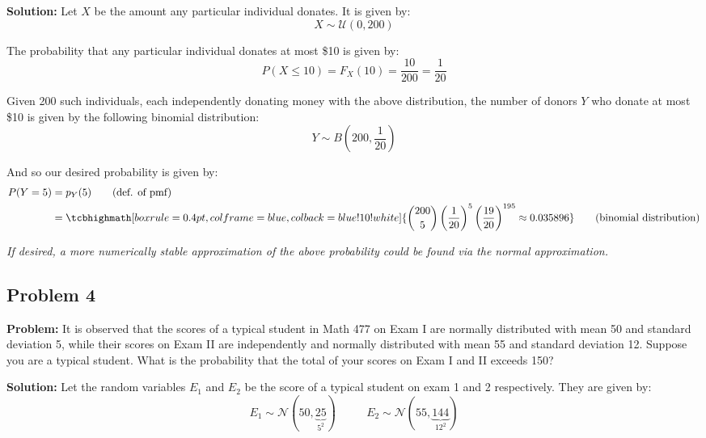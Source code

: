 \documentclass{article}
\begin{document}
\noindent\textbf{Solution:} Let $X$ be the amount any particular individual donates. It is given by:
\begin{equation*}
    X\sim\mathcal U(0,200)
\end{equation*}

The probability that any particular individual donates at most \$10 is given by:
\begin{equation*}
    P(X\le 10)=F_X(10)=\frac{10}{200}=\frac{1}{20}
\end{equation*}

Given 200 such individuals, each independently donating money with the above distribution, the number of donors $Y$ who donate at most \$10 is given by the following binomial distribution:
\begin{equation*}
    Y\sim B\left(200,\frac{1}{20}\right)
\end{equation*}

And so our desired probability is given by:
\begin{align*}
    P(Y=5)&=p_Y(5)\tag{def. of pmf}\\
    &=\tcbhighmath[boxrule=0.4pt,colframe=blue,colback=blue!10!white]{\binom{200}5 \left(\frac{1}{20}\right)^5\left(\frac{19}{20}\right)^{195}\approx0.035896}\tag{binomial distribution}
\end{align*}

\textit{If desired, a more numerically stable approximation of the above probability could be found via the normal approximation.}

\subsection*{Problem 4}
\noindent\textbf{Problem:} It is observed that the scores of a typical student in Math 477 on Exam I are normally distributed with mean 50 and standard deviation 5, while their scores on Exam II are independently and normally distributed with mean 55 and standard deviation 12. Suppose you are a typical student. What is the probability that the total of your scores on Exam I and II
exceeds 150?
\bigskip

\noindent\textbf{Solution:} Let the random variables $E_1$ and $E_2$ be the score of a typical student on exam 1 and 2 respectively. They are given by:
\begin{equation*}
    E_1\sim\mathcal N(50,\underbrace{25}_{5^2})\,\,\,\,\,\,\,\,\,\,\,\,\,\,\,\,E_2\sim\mathcal N(55,\underbrace{144}_{12^2})
\end{equation*}
\end{document}
